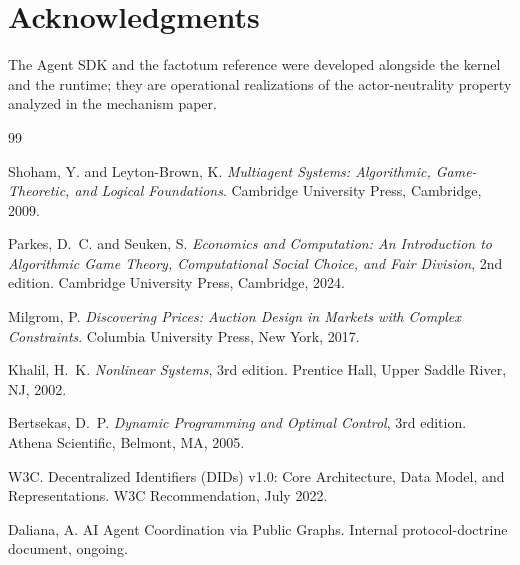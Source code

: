 \documentclass[11pt,a4paper]{article}
\theoremstyle{definition}
\theoremstyle{remark}
\begin{document}
\section*{Acknowledgments}
The Agent SDK and the factotum reference were developed alongside
the kernel and the runtime; they are operational realizations of
the actor-neutrality property analyzed in the mechanism paper.

\begin{thebibliography}{99}

Shoham, Y. and Leyton-Brown, K.
\newblock \emph{Multiagent Systems: Algorithmic, Game-Theoretic, and
  Logical Foundations}.
\newblock Cambridge University Press, Cambridge, 2009.

Parkes, D.~C. and Seuken, S.
\newblock \emph{Economics and Computation: An Introduction to
  Algorithmic Game Theory, Computational Social Choice, and Fair
  Division}, 2nd edition.
\newblock Cambridge University Press, Cambridge, 2024.

Milgrom, P.
\newblock \emph{Discovering Prices: Auction Design in Markets with
  Complex Constraints}.
\newblock Columbia University Press, New York, 2017.

Khalil, H.~K.
\newblock \emph{Nonlinear Systems}, 3rd edition.
\newblock Prentice Hall, Upper Saddle River, NJ, 2002.

Bertsekas, D.~P.
\newblock \emph{Dynamic Programming and Optimal Control}, 3rd edition.
\newblock Athena Scientific, Belmont, MA, 2005.

W3C.
\newblock Decentralized Identifiers (DIDs) v1.0: Core Architecture,
  Data Model, and Representations.
\newblock W3C Recommendation, July 2022.

Daliana, A.
\newblock AI Agent Coordination via Public Graphs.
\newblock Internal protocol-doctrine document, ongoing.

\end{thebibliography}
\end{document}
